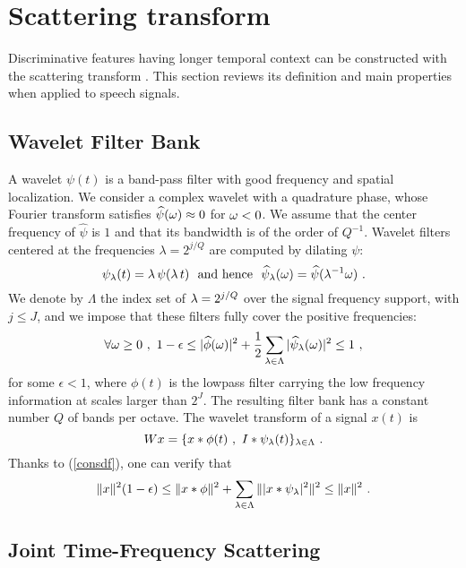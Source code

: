 \section{Scattering transform}
\label{scattsec}

Discriminative features having longer temporal context can be constructed with the 
scattering transform \cite{pami, deepscatt}. 
This section reviews its definition and main properties when applied to speech signals.

\subsection{Wavelet Filter Bank}

A wavelet $\psi (t)$ is a band-pass filter with good frequency and spatial localization.
 We consider a complex wavelet with a quadrature phase, 
whose Fourier transform satisfies
$\widehat \psi({\omega}) \approx 0$ for ${\omega} < 0$.
We assume that the center frequency of $\widehat \psi$ is $1$ and 
that its bandwidth is of the order of $Q^{-1}$. 
Wavelet filters centered
at the frequencies $\lambda = 2^{j/Q}$ are computed by dilating $\psi$:
\begin{equation}
\label{psidilation}
\psi_{\lambda} (t) = {\lambda}\, \psi({\lambda}\, t)~~\mbox{and hence}~~
\widehat \psi_{\lambda} ({\omega}) = \widehat \psi({\lambda}^{-1} \omega)~.
\end{equation}
We denote by $\Lambda$ the index set of ${\lambda} = 2^{j/Q}$ over
the signal frequency support, with $j \leq J$, 
and we impose that these filters fully cover the positive frequencies:
\begin{equation}
\label{consdf}
\forall {\omega} \geq 0~,~ 1- \epsilon 
\leq |\widehat{\phi}(\omega)|^2 + \frac 1 2 \sum_{{\lambda} \in \Lambda} |\widehat{\psi}_{\lambda}(\omega)|^2 \leq 1~,
\end{equation}
for some $\epsilon <1$, where $\phi(t)$ is the lowpass filter carrying the 
low frequency information at scales larger than $2^J$.
The resulting filter bank has a constant number $Q$ of bands per 
octave. The wavelet transform of a signal $x(t)$ is
\[
W x = \{x \ast \phi(t)~,~I \ast \psi_{\lambda}(t)  \}_{{\lambda} \in \Lambda}~.
\]
Thanks to (\ref{consdf}), one can verify that 
\begin{equation}
\label{lp_basic}
\| x \|^2 (1- \epsilon) \leq \| x \ast \phi \|^2 + \sum_{{\lambda} \in \Lambda} \| |x \ast \psi_{\lambda}|^2 \|^2  \leq \| x \|^2~.
\end{equation}

\subsection{Joint Time-Frequency Scattering}

